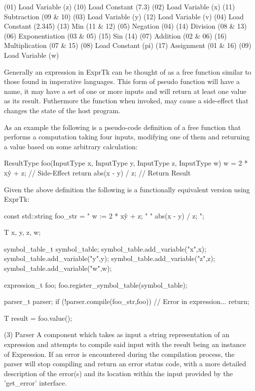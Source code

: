 (01) Load Variable  (z)        (10) Load Constant  (7.3)
(02) Load Variable  (x)        (11) Subtraction    (09 \& 10)
(03) Load Variable  (y)        (12) Load Variable  (v)
(04) Load Constant  (2.345)    (13) Min            (11 \& 12)
(05) Negation       (04)       (14) Division       (08 \& 13)
(06) Exponentiation (03 \& 05)  (15) Sin            (14)
(07) Addition       (02 \& 06)  (16) Multiplication (07 \& 15)
(08) Load Constant  (pi)       (17) Assignment     (01 \& 16)
(09) Load Variable  (w)


Generally an expression in ExprTk can be thought of as a free function
similar to those  found in imperative  languages. This form  of pseudo
function will have a name, it may have a set of one or more inputs and
will return at least one value as its result. Futhermore the  function
when invoked, may  cause a side-effect  that changes the  state of the
host program.

As an  example the  following is  a pseudo-code  definition of  a free
function that performs a computation taking four inputs, modifying one
of them and returning a value based on some arbitrary calculation:

ResultType foo(InputType x, InputType y, InputType z, InputType w)
{
w = 2 * x\^y + z;        // Side-Effect
return abs(x - y) / z;  // Return Result
}


Given the above definition the following is a functionally  equivalent
version using ExprTk:

const std::string foo\_str = " w := 2 * x\^y + z; "
" abs(x - y) / z;   ";

T x, y, z, w;

symbol\_table\_t symbol\_table;
symbol\_table.add\_variable("x",x);
symbol\_table.add\_variable("y",y);
symbol\_table.add\_variable("z",z);
symbol\_table.add\_variable("w",w);

expression\_t foo;
foo.register\_symbol\_table(symbol\_table);

parser\_t parser;
if (!parser.compile(foo\_str,foo))
{
// Error in expression...
return;
}

T result = foo.value();


(3) Parser
A  component  which  takes  as input  a  string  representation  of an
expression and attempts to compile said input with the result being an
instance  of  Expression.  If  an  error  is  encountered  during  the
compilation  process, the  parser will  stop compiling  and return  an
error status code,  with a more  detailed description of  the error(s)
and  its  location  within  the  input  provided  by  the  'get\_error'
interface.


